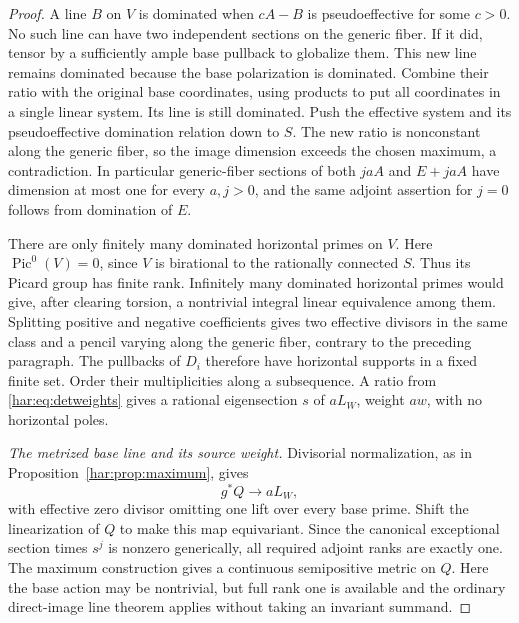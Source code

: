 \begin{proof}
A line \(B\) on \(V\) is dominated when \(cA-B\) is pseudoeffective
for some \(c>0\). No such line can have two independent sections on
the generic fiber. If it did, tensor by a sufficiently ample base
pullback to globalize them. This new line remains dominated because
the base polarization is dominated. Combine their ratio with the
original base coordinates, using products to put all coordinates
in a single linear system. Its line is still dominated. Push the
effective system and its pseudoeffective domination relation down
to \(S\). The new ratio is nonconstant along the generic fiber, so
the image dimension exceeds the chosen maximum, a contradiction.
In particular generic-fiber sections of both \(jaA\) and
\(E+jaA\) have dimension at most one for every \(a,j>0\), and the
same adjoint assertion for \(j=0\) follows from domination of \(E\).

There are only finitely many dominated horizontal primes on \(V\).
Here \(\operatorname{Pic}^0(V)=0\), since \(V\) is birational to the
rationally connected \(S\). Thus its Picard group has finite rank.
Infinitely many dominated horizontal primes would give, after clearing
torsion, a nontrivial integral linear equivalence among them. Splitting
positive and negative coefficients gives two effective divisors in
the same class and a pencil varying along the generic fiber, contrary
to the preceding paragraph. The pullbacks of \(D_i\) therefore have
horizontal supports in a fixed finite set. Order their multiplicities
along a subsequence. A ratio from \eqref{har:eq:detweights} gives a
rational eigensection \(s\) of \(aL_W\), weight \(aw\), with no
horizontal poles.

\smallskip\noindent\textit{The metrized base line and its source weight.}
Divisorial normalization, as in
Proposition~\ref{har:prop:maximum}, gives
\begin{equation}\label{har:eq:weightbase}
 g^*Q\longrightarrow aL_W,
\end{equation}
with effective zero divisor omitting one lift over every base prime.
Shift the linearization of \(Q\) to make this map equivariant. Since
the canonical exceptional section times \(s^j\) is nonzero generically,
all required adjoint ranks are exactly one. The maximum construction
gives a continuous semipositive metric on \(Q\). Here the base action
may be nontrivial, but full rank one is available and the ordinary
direct-image line theorem applies without taking an invariant summand.


\end{proof}
